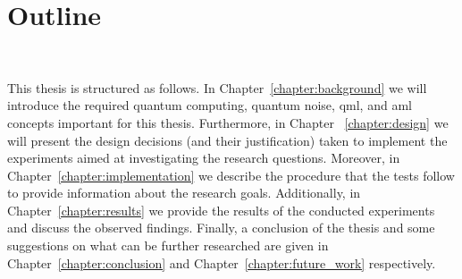 \section{Outline}\label{section:outline} \

This thesis is structured as follows. In Chapter~\ref{chapter:background}
we will introduce the required quantum computing, quantum noise, \ac{qml},
and \ac{aml} concepts important for this thesis. Furthermore, in Chapter
~\ref{chapter:design} we will present the design decisions (and their
justification) taken to implement the experiments aimed at investigating
the research questions. Moreover, in Chapter~\ref{chapter:implementation}
we describe the procedure that the tests follow to provide information
about the research goals. Additionally, in Chapter~\ref{chapter:results}
we provide the results of the conducted experiments and discuss the observed
findings. Finally, a conclusion of the thesis and some suggestions on what
can be further researched are given in Chapter~\ref{chapter:conclusion} and
Chapter~\ref{chapter:future_work} respectively.\